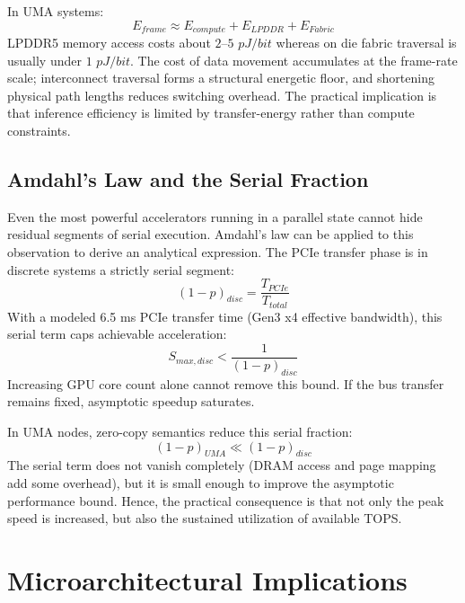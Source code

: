 \documentclass[conference]{IEEEtran}
\begin{document}
In UMA systems:
\begin{equation}
E_{frame} \approx E_{compute} + E_{LPDDR} + E_{Fabric}
\end{equation}
LPDDR5 memory access costs about $2$--$5$ $pJ/bit$ whereas on die fabric traversal is usually under $1$ $pJ/bit$. The cost of data movement accumulates at the frame-rate scale; interconnect traversal forms a structural energetic floor, and shortening physical path lengths reduces switching overhead. The practical implication is that inference efficiency is limited by transfer-energy rather than compute constraints.

\subsection{Amdahl's Law and the Serial Fraction}
Even the most powerful accelerators running in a parallel state cannot hide residual segments of serial execution. Amdahl's law can be applied to this observation to derive an analytical expression. The PCIe transfer phase is in discrete systems a strictly serial segment:
\begin{equation}
(1-p)_{disc} = \frac{T_{PCIe}}{T_{total}}
\end{equation}
With a modeled 6.5 ms PCIe transfer time (Gen3 x4 effective bandwidth), this serial term caps achievable acceleration:
\begin{equation}
S_{max,disc} < \frac{1}{(1-p)_{disc}}
\end{equation}
Increasing GPU core count alone cannot remove this bound. If the bus transfer remains fixed, asymptotic speedup saturates.

In UMA nodes, zero-copy semantics reduce this serial fraction:
\begin{equation}
(1-p)_{UMA} \ll (1-p)_{disc}
\end{equation}
The serial term does not vanish completely (DRAM access and page mapping add some overhead), but it is small enough to improve the asymptotic performance bound. Hence, the practical consequence is that not only the peak speed is increased, but also the sustained utilization of available TOPS.

\section{Microarchitectural Implications}
\end{document}
